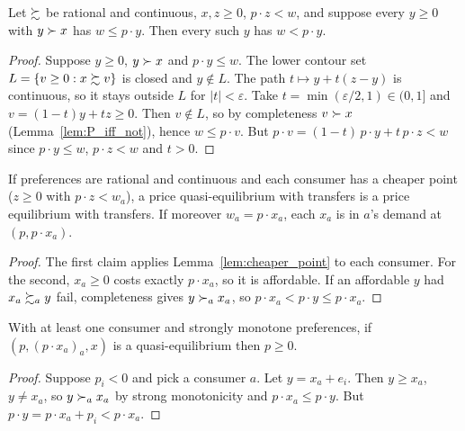 \begin{lemma}
\label{lem:cheaper_point}
\leanok
{}
Let $\succsim$ be rational and continuous, $x, z \ge 0$, $p \cdot z < w$, and suppose every $y \ge 0$ with $y \succ x$
has $w \le p \cdot y$. Then every such $y$ has $w < p \cdot y$.
\end{lemma}
\begin{proof}
\leanok
Suppose $y \ge 0$, $y \succ x$ and $p \cdot y \le w$. The lower contour set $L = \{v \ge 0 : x \succsim v\}$ is closed and
$y \notin L$. The path $t \mapsto y + t(z - y)$ is continuous, so it stays outside $L$ for $|t| < \varepsilon$. Take
$t = \min(\varepsilon/2, 1) \in (0, 1]$ and $v = (1 - t) y + t z \ge 0$. Then $v \notin L$, so by completeness
$v \succ x$ (Lemma~\ref{lem:P_iff_not}), hence $w \le p \cdot v$. But
$p \cdot v = (1 - t)\, p \cdot y + t\, p \cdot z < w$ since $p \cdot y \le w$, $p \cdot z < w$ and $t > 0$.
\end{proof}

\begin{theorem}
\label{thm:quasi_to_eq}
\leanok
{}
If preferences are rational and continuous and each consumer has a cheaper point ($z \ge 0$ with $p \cdot z < w_a$),
a price quasi-equilibrium with transfers is a price equilibrium with transfers. If moreover $w_a = p \cdot x_a$, each
$x_a$ is in $a$'s demand at $(p, p \cdot x_a)$.
\end{theorem}
\begin{proof}
\leanok
The first claim applies Lemma~\ref{lem:cheaper_point} to each consumer. For the second, $x_a \ge 0$ costs exactly
$p \cdot x_a$, so it is affordable. If an affordable $y$ had $x_a \succsim_a y$ fail, completeness gives $y \succ_a x_a$,
so $p \cdot x_a < p \cdot y \le p \cdot x_a$.
\end{proof}

\begin{lemma}
\label{lem:price_nonneg}
\leanok
{}
With at least one consumer and strongly monotone preferences, if $(p, (p \cdot x_a)_a, x)$ is a quasi-equilibrium
then $p \ge 0$.
\end{lemma}
\begin{proof}
\leanok
Suppose $p_i < 0$ and pick a consumer $a$. Let $y = x_a + e_i$. Then $y \ge x_a$, $y \neq x_a$, so $y \succ_a x_a$ by
strong monotonicity and $p \cdot x_a \le p \cdot y$. But $p \cdot y = p \cdot x_a + p_i < p \cdot x_a$.
\end{proof}

